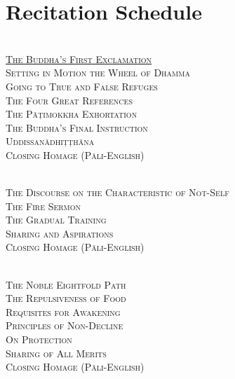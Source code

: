 \section{Recitation Schedule}
\label{schedule}

\begin{center}

  {\libertinusFont\selectfont\textbf{\textsc{}}}\\

  \textsc{
    \hyperref[buddhas-first-exclamation]{The Buddha's First Exclamation}\\
    Setting in Motion the Wheel of Dhamma\\
    Going to True and False Refuges\\
    The Four Great References\\
    The Pāṭimokkha Exhortation\\
    The Buddha's Final Instruction\\
    Uddissanādhiṭṭhāna\\
    Closing Homage (Pāli-English)}\\

  \bigskip

  {\libertinusFont\selectfont\textbf{\textsc{}}}\\

  \textsc{The Discourse on the Characteristic of Not-Self\\
    The Fire Sermon\\
    The Gradual Training\\
    Sharing and Aspirations\\
    Closing Homage (Pāli-English)}\\

  \bigskip

  {\libertinusFont\selectfont\textbf{\textsc{}}}\\

  \textsc{The Noble Eightfold Path\\
    The Repulsiveness of Food\\
    Requisites for Awakening\\
    Principles of Non-Decline\\
    On Protection\\
    Sharing of All Merits\\
    Closing Homage (Pāli-English)}\\

  \clearpage

  {\libertinusFont\selectfont\textbf{\textsc{}}}\\


\end{center}
